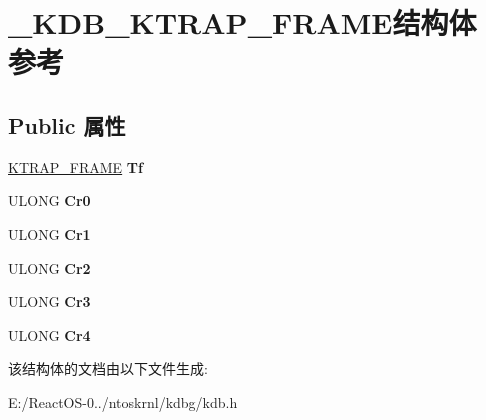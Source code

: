 \hypertarget{struct___k_d_b___k_t_r_a_p___f_r_a_m_e}{}\section{\+\_\+\+K\+D\+B\+\_\+\+K\+T\+R\+A\+P\+\_\+\+F\+R\+A\+M\+E结构体 参考}
\label{struct___k_d_b___k_t_r_a_p___f_r_a_m_e}
\subsection*{Public 属性}
\begin{DoxyCompactItemize}
\item 
\mbox{\label{struct___k_d_b___k_t_r_a_p___f_r_a_m_e_a86a4affa52395be2da3527365cfc9780}} 
\hyperlink{struct___k_t_r_a_p___f_r_a_m_e}{K\+T\+R\+A\+P\+\_\+\+F\+R\+A\+ME} {\bfseries Tf}
\item 
\mbox{\label{struct___k_d_b___k_t_r_a_p___f_r_a_m_e_acd98419dc0db0e00d9dba12c4daccc9f}} 
U\+L\+O\+NG {\bfseries Cr0}
\item 
\mbox{\label{struct___k_d_b___k_t_r_a_p___f_r_a_m_e_a9668bc9dea2aff4251bed36412a529d9}} 
U\+L\+O\+NG {\bfseries Cr1}
\item 
\mbox{\label{struct___k_d_b___k_t_r_a_p___f_r_a_m_e_a8354d7cc8ac8b1e4b84c983917497f8f}} 
U\+L\+O\+NG {\bfseries Cr2}
\item 
\mbox{\label{struct___k_d_b___k_t_r_a_p___f_r_a_m_e_aacb63b23eaf3f5009a1ff2332a5493e9}} 
U\+L\+O\+NG {\bfseries Cr3}
\item 
\mbox{\label{struct___k_d_b___k_t_r_a_p___f_r_a_m_e_a17f3c26046397048d87c693ddcff0e1e}} 
U\+L\+O\+NG {\bfseries Cr4}
\end{DoxyCompactItemize}


该结构体的文档由以下文件生成\+:\begin{DoxyCompactItemize}
\item 
E\+:/\+React\+O\+S-\/0../ntoskrnl/kdbg/kdb.\+h\end{DoxyCompactItemize}
